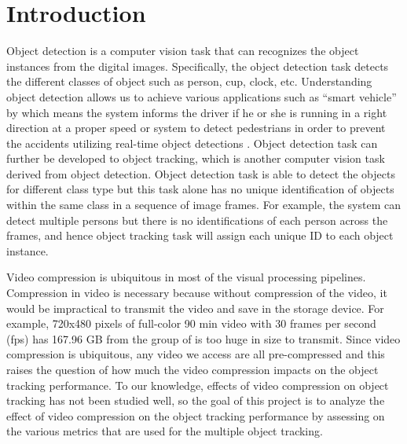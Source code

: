 \chapter{Introduction}
\label{chap:introduction}


%

Object detection is a computer vision task that can recognizes the object instances from the digital images. Specifically, the object detection task detects the different classes of object such as person, cup, clock, etc. Understanding object detection allows us to achieve various applications such as “smart vehicle” by which means the system informs the driver if he or she is running in a right direction at a proper speed or system to detect pedestrians in order to prevent the accidents utilizing real-time object detections \cite{gavrila_real-time_1999}. Object detection task can further be developed to object tracking, which is another computer vision task derived from object detection. Object detection task is able to detect the objects for different class type but this task alone has no unique identification of objects within the same class in a sequence of image frames. For example, the system can detect multiple persons but there is no identifications of each person across the frames, and hence object tracking task will assign each unique ID to each object instance.

Video compression is ubiquitous in most of the visual processing pipelines. Compression in video is necessary because without compression of the video, it would be impractical to transmit the video and save in the storage device. For example, 720x480 pixels of full-color 90 min video with 30 frames per second (fps) has 167.96 GB from the group of  \citeauthor{ponlatha_comparison_2013} \cite{ponlatha_comparison_2013} is too huge in size to transmit. Since video compression is ubiquitous, any video we access are all pre-compressed and this raises the question of how much the video compression impacts on the object tracking performance. To our knowledge, effects of video compression on object tracking has not been studied well, so the goal of this project is to analyze the effect of video compression on the object tracking performance by assessing on the various metrics that are used for the multiple object tracking.

